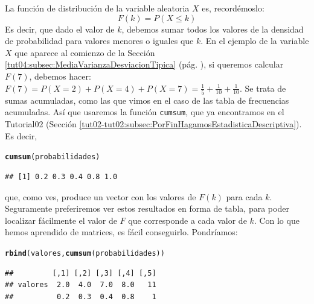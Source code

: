 \documentclass[10pt,a4paper]{article}\usepackage[]{graphicx}\usepackage[]{color}
\makeatletter
\newcommand{\hlstd}[1]{\textcolor[rgb]{0.345,0.345,0.345}{#1}}%
\newcommand{\hlkwd}[1]{\textcolor[rgb]{0.737,0.353,0.396}{\textbf{#1}}}%
\newenvironment{kframe}{%
 \def\at@end@of@kframe{}%
 \ifinner\ifhmode%
  \def\at@end@of@kframe{\end{minipage}}%
  \begin{minipage}{\columnwidth}%
 \fi\fi%
 \def\FrameCommand##1{\hskip\@totalleftmargin \hskip-\fboxsep
 \colorbox{shadecolor}{##1}\hskip-\fboxsep
     \hskip-\linewidth \hskip-\@totalleftmargin \hskip\columnwidth}%
 \MakeFramed {\advance\hsize-\width
   \@totalleftmargin\z@ \linewidth\hsize
   \@setminipage}}%
 {\par\unskip\endMakeFramed%
 \at@end@of@kframe}
\newenvironment{knitrout}{}{} %
\newcounter {cont01}
\makeatother
\begin{document}
La función de distribución de la variable aleatoria $X$ es, recordémoslo:
\[F(k)=P(X\leq k)\]
Es decir, que dado el valor de $k$, debemos sumar todos los valores de la densidad de probabilidad para valores menores o iguales que $k$. En el ejemplo de la variable $X$ que aparece al comienzo de la Sección \ref{tut04:subsec:MediaVarianzaDesviacionTipica} (pág. \pageref{tut04:subsec:MediaVarianzaDesviacionTipica}), si queremos calcular $F(7)$, debemos hacer:
$F(7)=P(X=2)+P(X=4)+P(X=7)=\frac{1}{5}+\frac{1}{10}+\frac{1}{10}.$
Se trata de sumas acumuladas, como las que vimos en el caso de las tabla de frecuencias acumuladas. Así que usaremos la función {\tt cumsum}, que ya encontramos en el Tutorial02 (Sección \ref{tut02-tut02:subsec:PorFinHagamosEstadisticaDescriptiva}). Es decir,
\begin{knitrout}
\color{fgcolor}\begin{kframe}
\begin{alltt}
\hlkwd{cumsum}\hlstd{(probabilidades)}
\end{alltt}
\begin{verbatim}
## [1] 0.2 0.3 0.4 0.8 1.0
\end{verbatim}
\end{kframe}
\end{knitrout}
%
que, como ves, produce un vector con los valores de $F(k)$ para cada $k$.
Seguramente preferiremos ver estos resultados en forma de tabla, para poder localizar fácilmente el valor de $F$ que corresponde a cada valor de $k$. Con lo que hemos aprendido de matrices, es fácil conseguirlo. Pondríamos:
\begin{knitrout}
\color{fgcolor}\begin{kframe}
\begin{alltt}
\hlkwd{rbind}\hlstd{(valores,}\hlkwd{cumsum}\hlstd{(probabilidades))}
\end{alltt}
\begin{verbatim}
##         [,1] [,2] [,3] [,4] [,5]
## valores  2.0  4.0  7.0  8.0   11
##          0.2  0.3  0.4  0.8    1
\end{verbatim}
\end{kframe}
\end{knitrout}
\end{document}
